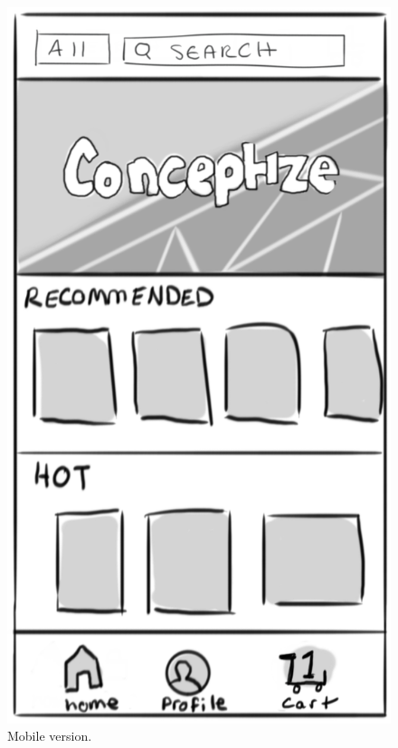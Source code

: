 \documentclass[]{article}
\begin{document}
\begin{enumerate}
			\begin{figure}
			  \includegraphics[width=\linewidth]{./pictures/homepage_mobile.png}
			  \caption{Mobile version.}
			  \label{fig:mobile1}
			\end{figure}			
			

\end{enumerate}
\end{document}
